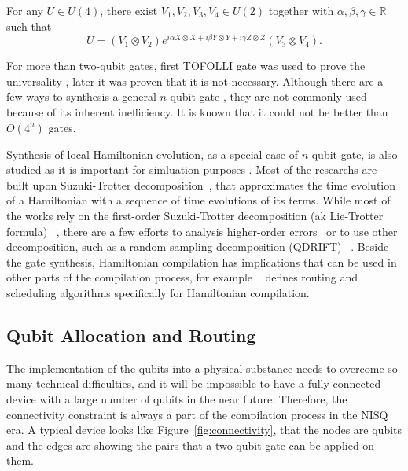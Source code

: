 \begin{lemma}\label{lem:kak_decomposition}
For any $U \in U(4)$, there exist $V_1, V_2, V_3, V_4 \in U(2)$ together with $\alpha, \beta, \gamma \in \mathbb{R}$ such that
\begin{equation}
  U = (V_1 \otimes V_2) e^{i\alpha X\otimes X + i\beta Y\otimes Y + i\gamma Z\otimes Z} (V_3 \otimes V_4).
  \end{equation}
\end{lemma}

For more than two-qubit gates, first TOFOLLI gate was used to prove the universality \cite{barenco1995}, later it was proven that it is not necessary. Although there are a few ways to synthesis a general $n$-qubit gate  \cite{sousa2006,shende2006}, they are not commonly used because of its inherent inefficiency. It is known that it could not be better than $O(4^n)$ gates. \cite{shende2006}

Synthesis of local Hamiltonian evolution, as a special case of $n$-qubit gate, is also studied as it is important for simluation purposes \cite{childs2018}. Most of the researchs are built upon Suzuki-Trotter decomposition~\cite{trotter1959, suzuki1991}, that approximates the time evolution of a Hamiltonian with a sequence of time evolutions of its terms. While most of the works rely on the first-order Suzuki-Trotter decomposition (ak Lie-Trotter formula) ~\cite{sivarajah2021, qiskit2023}, there are a few efforts to analysis higher-order errors~\cite{childs2021} or to use other decomposition, such as a random sampling decomposition (QDRIFT) ~\cite{campbell2019}. Beside the gate synthesis, Hamiltonian compilation has implications that can be used in other parts of the compilation process, for example ~\cite{lao2021} defines routing and scheduling algorithms specifically for Hamiltonian compilation.

\subsection{Qubit Allocation and Routing}

The implementation of the qubits into a physical substance needs to overcome so many technical difficulties, and it will be impossible to have a fully connected device with a large number of qubits in the near future. Therefore, the connectivity constraint is always a part of the compilation process in the NISQ era. A typical device looks like Figure~\ref{fig:connectivity}, that the nodes are qubits and the edges are showing the pairs that a two-qubit gate can be applied on them.

